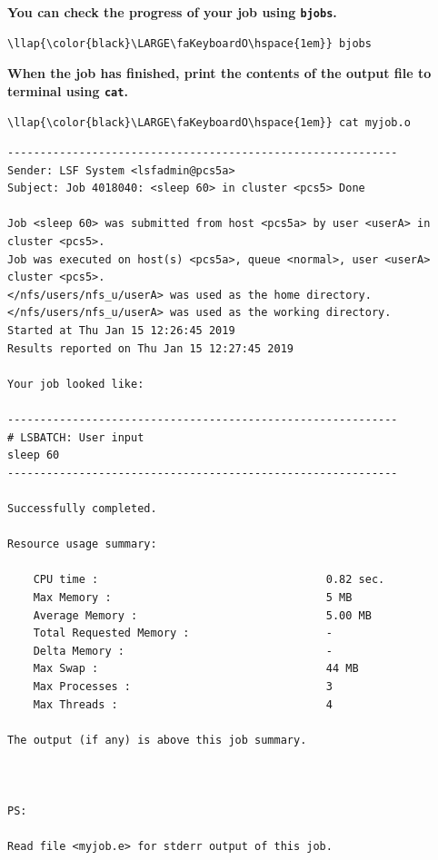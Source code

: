 \documentclass[11pt]{article}
\begin{document}
    \textbf{You can check the progress of your job using \texttt{bjobs}.}

\begin{terminalinput}
\begin{Verbatim}[commandchars=\\\{\}]
\llap{\color{black}\LARGE\faKeyboardO\hspace{1em}} bjobs
\end{Verbatim}
\end{terminalinput}


    \textbf{When the job has finished, print the contents of the output file
to terminal using \texttt{cat}.}

\begin{terminalinput}
\begin{Verbatim}[commandchars=\\\{\}]
\llap{\color{black}\LARGE\faKeyboardO\hspace{1em}} cat myjob.o
\end{Verbatim}
\end{terminalinput}


    \begin{verbatim}
------------------------------------------------------------
Sender: LSF System <lsfadmin@pcs5a>
Subject: Job 4018040: <sleep 60> in cluster <pcs5> Done

Job <sleep 60> was submitted from host <pcs5a> by user <userA> in cluster <pcs5>.
Job was executed on host(s) <pcs5a>, queue <normal>, user <userA> cluster <pcs5>.
</nfs/users/nfs_u/userA> was used as the home directory.
</nfs/users/nfs_u/userA> was used as the working directory.
Started at Thu Jan 15 12:26:45 2019
Results reported on Thu Jan 15 12:27:45 2019

Your job looked like:

------------------------------------------------------------
# LSBATCH: User input
sleep 60
------------------------------------------------------------

Successfully completed.

Resource usage summary:

    CPU time :                                   0.82 sec.
    Max Memory :                                 5 MB
    Average Memory :                             5.00 MB
    Total Requested Memory :                     -
    Delta Memory :                               -
    Max Swap :                                   44 MB
    Max Processes :                              3
    Max Threads :                                4

The output (if any) is above this job summary.



PS:

Read file <myjob.e> for stderr output of this job.
\end{verbatim}
\end{document}
